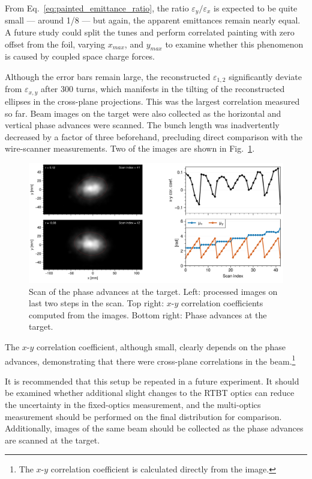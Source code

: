 % 
From Eq.~\ref{eq:painted_emittance_ratio}, the ratio $\varepsilon_y / \varepsilon_x$ is expected to be quite small — around 1/8 — but again, the apparent emittances remain nearly equal. A future study could split the tunes and perform correlated painting with zero offset from the foil, varying $x_{max}$, and $y_{max}$ to examine whether this phenomenon is caused by coupled space charge forces.

Although the error bars remain large, the reconstructed $\varepsilon_{1,2}$ significantly deviate from $\varepsilon_{x,y}$ after 300 turns, which manifests in the tilting of the reconstructed ellipses in the cross-plane projections. This was the largest correlation measured so far. Beam images on the target were also collected as the horizontal and vertical phase advances were scanned. The bunch length was inadvertently decreased by a factor of three beforehand, precluding direct comparison with the wire-scanner measurements. Two of the images are shown in Fig.~\ref{fig:exp3_target_scan}. 
%
\begin{figure}[!p]
    \centering
    \vspace*{5cm}
    \includegraphics[width=\textwidth]{Images/chapter5/exp3/target_scan/target_scan.png}
    \caption{Scan of the phase advances at the target. Left: processed images on last two steps in the scan. Top right: $x$-$y$ correlation coefficients computed from the images. Bottom right: Phase advances at the target.}
    \label{fig:exp3_target_scan}
    \vspace*{5cm}
\end{figure}
%
The $x$-$y$ correlation coefficient, although small, clearly depends on the phase advances, demonstrating that there were cross-plane correlations in the beam.\footnote{The $x$-$y$ correlation coefficient is calculated directly from the image.}

It is recommended that this setup be repeated in a future experiment. It should be examined whether additional slight changes to the RTBT optics can reduce the uncertainty in the fixed-optics measurement, and the multi-optics measurement should be performed on the final distribution for comparison. Additionally, images of the same beam should be collected as the phase advances are scanned at the target.

